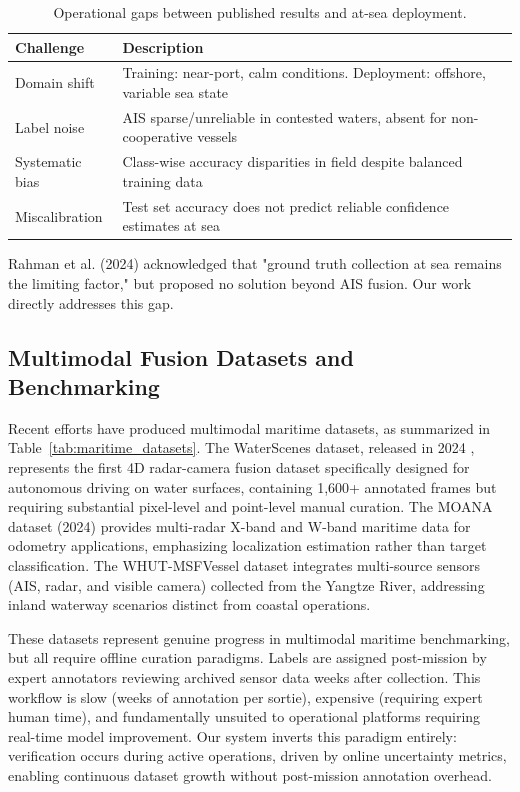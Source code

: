 \documentclass[conf]{asmeconf}
\begin{document}
\begin{table}[t]
\caption{Operational gaps between published results and at-sea deployment.}
\label{tab:deployment_gaps}
\centering
\small
\begin{tabular}{@{}lp{5cm}@{}}
\toprule
Challenge & Description \\
\midrule
Domain shift & Training: near-port, calm conditions. Deployment: offshore, variable sea state \\
\midrule
Label noise & AIS sparse/unreliable in contested waters, absent for non-cooperative vessels \\
\midrule
Systematic bias & Class-wise accuracy disparities in field despite balanced training data \\
\midrule
Miscalibration & Test set accuracy does not predict reliable confidence estimates at sea \\
\bottomrule
\end{tabular}
\end{table}

Rahman et al. (2024) \cite{Rahman2024RadarClassification} acknowledged that "ground truth collection at sea remains the limiting factor," but proposed no solution beyond AIS fusion. Our work directly addresses this gap.

\subsection{Multimodal Fusion Datasets and Benchmarking}

Recent efforts have produced multimodal maritime datasets, as summarized in Table~\ref{tab:maritime_datasets}. The WaterScenes dataset, released in 2024 \cite{Zhang2024WaterScenes}, represents the first 4D radar-camera fusion dataset specifically designed for autonomous driving on water surfaces, containing 1,600+ annotated frames but requiring substantial pixel-level and point-level manual curation. The MOANA dataset (2024) \cite{Park2024MOANARadar} provides multi-radar X-band and W-band maritime data for odometry applications, emphasizing localization estimation rather than target classification. The WHUT-MSFVessel dataset integrates multi-source sensors (AIS, radar, and visible camera) collected from the Yangtze River, addressing inland waterway scenarios distinct from coastal operations.

These datasets represent genuine progress in multimodal maritime benchmarking, but all require offline curation paradigms. Labels are assigned post-mission by expert annotators reviewing archived sensor data weeks after collection. This workflow is slow (weeks of annotation per sortie), expensive (requiring expert human time), and fundamentally unsuited to operational platforms requiring real-time model improvement. Our system inverts this paradigm entirely: verification occurs during active operations, driven by online uncertainty metrics, enabling continuous dataset growth without post-mission annotation overhead.
\end{document}
